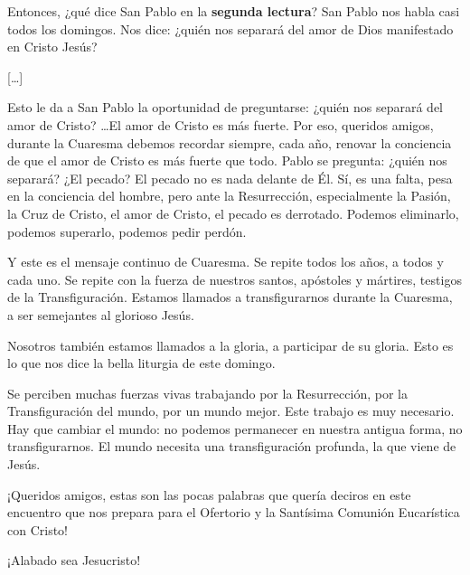 \begin{body}
Entonces, ¿qué dice San Pablo en la \textbf{segunda lectura}? San Pablo nos habla casi todos los domingos. Nos dice: ¿quién nos separará del amor de Dios manifestado en Cristo Jesús?

[\ldots]

Esto le da a San Pablo la oportunidad de preguntarse: ¿quién nos separará del amor de Cristo? \ldots El amor de Cristo es más fuerte. Por eso, queridos amigos, durante la Cuaresma debemos recordar siempre, cada año, renovar la conciencia de que el amor de Cristo es más fuerte que todo. Pablo se pregunta: ¿quién nos separará? ¿El pecado? El pecado no es nada delante de Él. Sí, es una falta, pesa en la conciencia del hombre, pero ante la Resurrección, especialmente la Pasión, la Cruz de Cristo, el amor de Cristo, el pecado es derrotado. Podemos eliminarlo, podemos superarlo, podemos pedir perdón.

Y este es el mensaje continuo de Cuaresma. Se repite todos los años, a todos y cada uno. Se repite con la fuerza de nuestros santos, apóstoles y mártires, testigos de la Transfiguración. Estamos llamados a transfigurarnos durante la Cuaresma, a ser semejantes al glorioso Jesús.

Nosotros también estamos llamados a la gloria, a participar de su gloria. Esto es lo que nos dice la bella liturgia de este domingo.


 \txtsmall{[\ldots]}

Se perciben muchas fuerzas vivas trabajando por la Resurrección, por la Transfiguración del mundo, por un mundo mejor. Este trabajo es muy necesario. Hay que cambiar el mundo: no podemos permanecer en nuestra antigua forma, no transfigurarnos. El mundo necesita una transfiguración profunda, la que viene de Jesús.

¡Queridos amigos, estas son las pocas palabras que quería deciros en este encuentro que nos prepara para el Ofertorio y la Santísima Comunión Eucarística con Cristo!

¡Alabado sea Jesucristo!
\end{body}

